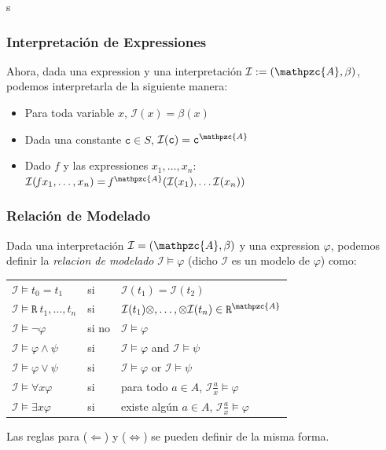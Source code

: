 \documentclass{beamer}
\begin{document}
s\begin{frame}
    \frametitle{Interpretaci\'on de Expressiones}
    Ahora, dada una expression y una interpretaci\'on $\mathcal{I}:=(\mathpzc{A},\beta)$,
    podemos interpretarla de la siguiente manera:
    \begin{itemize}
        \item{Para toda variable $x$, $\mathcal{I}(x)=\beta(x)$}
        \item{Dada una constante $\mathtt{c}\in S$, $\mathcal{I}(\mathtt{c})=\mathtt{c}^{\mathpzc{A}}$}
        \item{Dado $\mathit{f}$ y las expressiones $x_1,\ldots,x_n$:
            $\mathcal{I} (\mathit{f} x_1,\ldots ,x_n) = \mathit{f}^{\mathpzc{A}}(\mathcal{I}(x_1),\ldots\mathcal{I}(x_n))$}
    \end{itemize}
\end{frame}

\begin{frame}
    \frametitle{Relaci\'on de Modelado}
    Dada una interpretaci\'on $\mathcal{I}=(\mathpzc{A},\beta)$ y una
    expression $\varphi$, podemos definir la \emph{relacion de modelado} $\mathcal{I}\models\varphi$
    (dicho $\mathcal{I}$ es un modelo de $\varphi$) como:
    \\\vspace{0.5cm}
    \begin{tabular}{l l l}
        $\mathcal{I} \models t_0=t_1$ & si & $\mathcal{I}(t_1)=\mathcal{I}(t_2)$ \\
        $\mathcal{I} \models \mathtt{R}\ t_1,\ldots,t_n$ & si & $\mathcal{I}(t_1)\otimes,\ldots,\otimes\mathcal{I}(t_n) \in \mathtt{R}^\mathpzc{A}$\\
        $\mathcal{I} \models \neg \varphi$ & si no & $\mathcal{I} \models \varphi$\\
        $\mathcal{I} \models \varphi\wedge\psi$ & si & $\mathcal{I}\models\varphi$ and $\mathcal{I}\models\psi$\\
        $\mathcal{I} \models \varphi\vee\psi$ & si & $\mathcal{I}\models\varphi$ or $\mathcal{I}\models\psi$ \\
        $\mathcal{I} \models \forall x \varphi$ & si & para todo $a \in A$, $\mathcal{I}\frac{a}{x}\models\varphi$ \\
        $\mathcal{I} \models \exists x \varphi$ & si & existe alg\'un $a \in A$, $\mathcal{I}\frac{a}{x}\models\varphi$
    \end{tabular}

    \vspace{0.5cm}
    Las reglas para ($\Leftarrow$) y ($\Leftrightarrow$) se pueden definir de la misma forma.
\end{frame}
\end{document}

